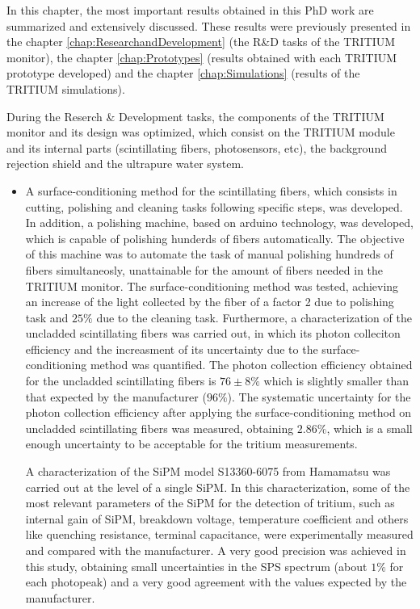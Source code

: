 In this chapter, the most important results obtained in this PhD work are summarized and extensively discussed. These results were previously presented in the chapter \ref{chap:ResearchandDevelopment} (the R\&D tasks of the TRITIUM monitor), the chapter \ref{chap:Prototypes} (results obtained with each TRITIUM prototype developed) and the chapter \ref{chap:Simulations} (results of the TRITIUM simulations).

During the Reserch \& Development tasks, the components of the TRITIUM monitor and its design was optimized, which consist on the TRITIUM module and its internal parts (scintillating fibers, photosensors, etc), the background rejection shield and the ultrapure water system. 

\begin{itemize}
\item{} A surface-conditioning method for the scintillating fibers, which consists in cutting, polishing and cleaning tasks following specific steps, was developed. In addition, a polishing machine, based on arduino technology, was developed, which is capable of polishing hunderds of fibers automatically. The objective of this machine was to automate the task of manual polishing hundreds of fibers simultaneosly, unattainable for the amount of fibers needed in the TRITIUM monitor. The surface-conditioning method was tested, achieving an increase of the light collected by the fiber of a factor 2 due to polishing task and $25\%$ due to the cleaning task. Furthermore, a characterization of the uncladded scintillating fibers was carried out, in which its photon colleciton efficiency and the increasment of its uncertainty due to the surface-conditioning method was quantified. The photon collection efficiency obtained for the uncladded scintillating fibers is $76\pm 8\%$ which is slightly smaller than that expected by the manufacturer ($96\%$). The systematic uncertainty for the photon collection efficiency after applying the surface-conditioning method on uncladded scintillating fibers was measured, obtaining $2.86\%$, which is a small enough uncertainty to be acceptable for the tritium measurements.

A characterization of the SiPM model S13360-6075 from Hamamatsu was carried out at the level of a single SiPM. In this characterization, some of the most relevant parameters of the SiPM for the detection of tritium, such as internal gain of SiPM, breakdown voltage, temperature coefficient and others like quenching resistance, terminal capacitance, were experimentally measured and compared with the manufacturer. A very good precision was achieved in this study, obtaining small uncertainties in the SPS spectrum (about $1\%$ for each photopeak) and a very good agreement with the values expected by the manufacturer.


\end{itemize}
